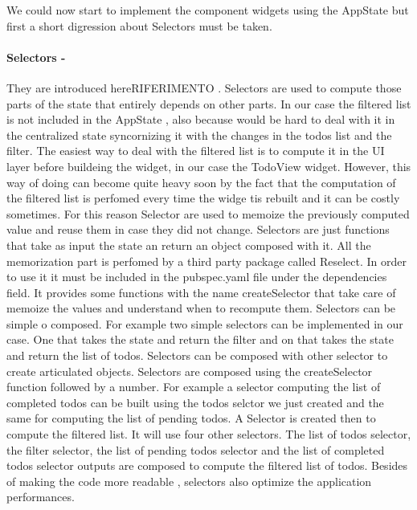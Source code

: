 We could now start to implement the component widgets using the AppState but first a short digression about Selectors must be taken.
\paragraph{Selectors - }
\label{subpar:todo_app_bloc_core_state}
They are introduced hereRIFERIMENTO . Selectors are used to compute those parts of the state that entirely depends on other parts. In our case the filtered list is not included in the AppState , also because would be hard to deal with it in the centralized state syncornizing it with the changes in the todos list and the filter. The easiest way to deal with the filtered list is to compute it in the UI layer before buildeing the widget, in our case the TodoView widget. However, this way of doing can become quite heavy soon by the fact that the computation of the filtered list is perfomed every time the widge tis rebuilt and it can be costly sometimes. For this reason Selector are used to memoize the previously computed value and reuse them in case they did not change. Selectors are just functions that take as input the state an return an object composed with it. All the memorization part is perfomed by a third party package called Reselect. In order to use it it must be included in the pubspec.yaml file under the dependencies field. It provides some functions with the name createSelector that take care of memoize the values and understand when to recompute them. Selectors can be simple o composed. For example two simple selectors can be implemented in our case. One that takes the state and return the filter and on that takes the state and return the list of todos. Selectors can be composed with other selector to create articulated objects. Selectors are composed using the createSelector function followed by a number. For example a selector computing the list of completed todos can be built using the todos selctor we just created and the same for computing the list of pending todos. A Selector is created then to compute the filtered list. It will use four other selectors. The list of todos selector, the filter selector, the list of pending todos selector and the list of completed todos selector outputs are composed to compute the filtered list of todos. Besides of making the code more readable , selectors also optimize the application performances.
